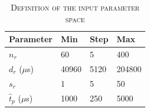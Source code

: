 




\begin{table}[t]
\centering
\renewcommand{\arraystretch}{1.2}
\caption{\textsc{Definition of the input parameter space}\label{tab:sumo parameters}}
\begin{tabular}{llll}
\hline
\textbf{Parameter}       & \textbf{Min}  & \textbf{Step}   & \textbf{Max}  \\
\hline
$n_r$        & 60 & 5 & 400  \\
$d_r$ ($\mu$s)          & 40960 & 5120 & 204800    \\
$s_r$           & 1 & 5 & 50    \\
$\hat{t}_p$ ($\mu$s)           & 1000 & 250 & 5000    \\
\hline
\end{tabular}
\end{table}


 






